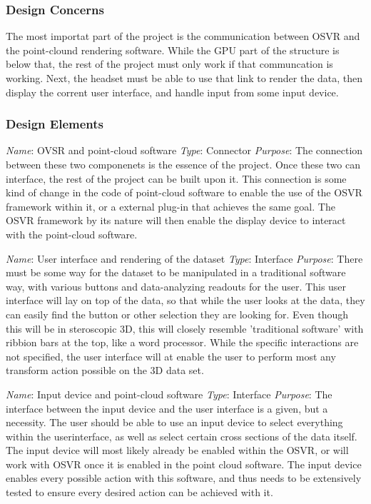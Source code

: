 \documentclass{article}
\begin{document}
\subsubsection{Design Concerns}
The most importat part of the project is the communication between OSVR and the point-clound rendering software.
While the GPU part of the structure is below that, the rest of the project must only work if that communcation is working.
Next, the headset must be able to use that link to render the data, then display the corrent user interface, and handle
input from some input device.

\subsubsection{Design Elements}

\textit{Name}: OVSR and point-cloud software
\textit{Type}: Connector
\textit{Purpose}: The connection between these two componenets is the essence of the project. Once these two can interface,
the rest of the project can be built upon it. This connection is some kind of change in the code of point-cloud software
to enable the use of the OSVR framework within it, or a external plug-in that achieves the same goal. The OSVR framework
by its nature will then enable the display device to interact with the point-cloud software.\\
\newline

\textit{Name}: User interface and rendering of the dataset
\textit{Type}: Interface
\textit{Purpose}: There must be some way for the dataset to be manipulated in a traditional software way, with various
buttons and data-analyzing readouts for the user. This user interface will lay on top of the data, so that while the user
looks at the data, they can easily find the button or other selection they are looking for. Even though this will be in
steroscopic 3D, this will closely resemble 'traditional software' with ribbion bars at the top, like a word processor.
While the specific interactions are not specified, the user interface will at enable the user to perform most any transform
action possible on the 3D data set.\\
\newline

\textit{Name}: Input device and point-cloud software
\textit{Type}: Interface
\textit{Purpose}: The interface between the input device and the user interface is a given, but a necessity. The user should
be able to use an input device to select everything within the userinterface, as well as select certain cross sections of the
data itself. The input device will most likely already be enabled within the OSVR, or will work with OSVR once it is enabled
in the point cloud software. The input device enables every possible action with this software, and thus needs to be extensively
tested to ensure every desired action can be achieved with it.
\end{document}
